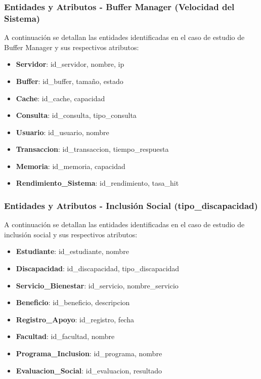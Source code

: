 \documentclass{article}
\begin{document}
\subsubsection{Entidades y Atributos - Buffer Manager (Velocidad del Sistema)}

A continuación se detallan las entidades identificadas en el caso de estudio de Buffer Manager y sus respectivos atributos:

\begin{itemize}
    \item \textbf{Servidor}: id\_servidor, nombre, ip
    \item \textbf{Buffer}: id\_buffer, tamaño, estado
    \item \textbf{Cache}: id\_cache, capacidad
    \item \textbf{Consulta}: id\_consulta, tipo\_consulta
    \item \textbf{Usuario}: id\_usuario, nombre
    \item \textbf{Transaccion}: id\_transaccion, tiempo\_respuesta
    \item \textbf{Memoria}: id\_memoria, capacidad
    \item \textbf{Rendimiento\_Sistema}: id\_rendimiento, tasa\_hit
\end{itemize}

\subsubsection{Entidades y Atributos - Inclusión Social (tipo\_discapacidad)}

A continuación se detallan las entidades identificadas en el caso de estudio de inclusión social y sus respectivos atributos:

\begin{itemize}
    \item \textbf{Estudiante}: id\_estudiante, nombre
    \item \textbf{Discapacidad}: id\_discapacidad, tipo\_discapacidad
    \item \textbf{Servicio\_Bienestar}: id\_servicio, nombre\_servicio
    \item \textbf{Beneficio}: id\_beneficio, descripcion
    \item \textbf{Registro\_Apoyo}: id\_registro, fecha
    \item \textbf{Facultad}: id\_facultad, nombre
    \item \textbf{Programa\_Inclusion}: id\_programa, nombre
    \item \textbf{Evaluacion\_Social}: id\_evaluacion, resultado
\end{itemize}
\end{document}
